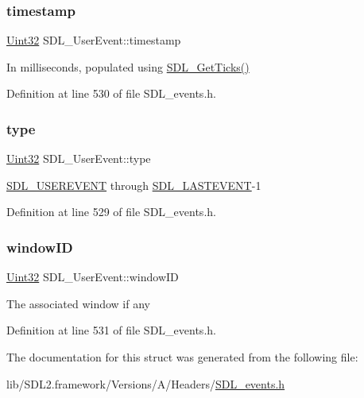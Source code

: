 \mbox{\label{struct_s_d_l___user_event_adbf1d34c73138a0c549310e5d4ad0c35}} 
\subsubsection{\texorpdfstring{timestamp}{timestamp}}
{\footnotesize\ttfamily \mbox{\hyperlink{_s_d_l__stdinc_8h_add440eff171ea5f55cb00c4a9ab8672d}{Uint32}} S\+D\+L\+\_\+\+User\+Event\+::timestamp}

In milliseconds, populated using \mbox{\hyperlink{_s_d_l__timer_8h_a0b9bc71d6287e0ffafdc3419760fe2b3}{S\+D\+L\+\_\+\+Get\+Ticks()}} 

Definition at line 530 of file S\+D\+L\+\_\+events.\+h.

\mbox{\label{struct_s_d_l___user_event_ab7afa8b98dbd7b52bef41155e10f7340}} 
\subsubsection{\texorpdfstring{type}{type}}
{\footnotesize\ttfamily \mbox{\hyperlink{_s_d_l__stdinc_8h_add440eff171ea5f55cb00c4a9ab8672d}{Uint32}} S\+D\+L\+\_\+\+User\+Event\+::type}

\mbox{\hyperlink{_s_d_l__events_8h_a3b589e89be6b35c02e0dd34a55f3fccaa4364c23f54802309e83fdb9b1c07c719}{S\+D\+L\+\_\+\+U\+S\+E\+R\+E\+V\+E\+NT}} through \mbox{\hyperlink{_s_d_l__events_8h_a3b589e89be6b35c02e0dd34a55f3fccaaffeac40a4ff366717c0ebc74118ea2ae}{S\+D\+L\+\_\+\+L\+A\+S\+T\+E\+V\+E\+NT}}-\/1 

Definition at line 529 of file S\+D\+L\+\_\+events.\+h.

\mbox{\label{struct_s_d_l___user_event_abccefa10e0e0e3a0801bc6d836a08da7}} 
\subsubsection{\texorpdfstring{windowID}{windowID}}
{\footnotesize\ttfamily \mbox{\hyperlink{_s_d_l__stdinc_8h_add440eff171ea5f55cb00c4a9ab8672d}{Uint32}} S\+D\+L\+\_\+\+User\+Event\+::window\+ID}

The associated window if any 

Definition at line 531 of file S\+D\+L\+\_\+events.\+h.



The documentation for this struct was generated from the following file\+:\begin{DoxyCompactItemize}
\item 
lib/\+S\+D\+L2.\+framework/\+Versions/\+A/\+Headers/\mbox{\hyperlink{_s_d_l__events_8h}{S\+D\+L\+\_\+events.\+h}}\end{DoxyCompactItemize}
